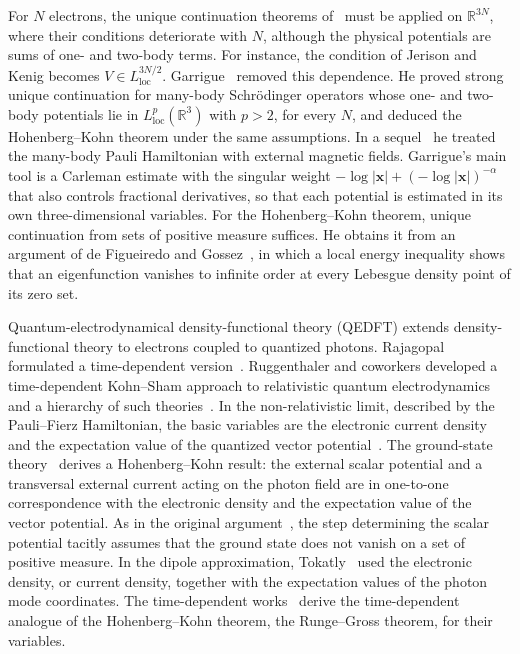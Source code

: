 \documentclass[final,reqno]{amsart}
\theoremstyle{remark}
\newcommand{\RR}{\mathbb{R}}
\newcommand{\vx}{\mathbf{x}}
\begin{document}
For $N$ electrons, the unique continuation theorems
of~\cite{jerison1985unique,kurata1997unique,koch2001carleman} must be
applied on $\RR^{3N}$, where their conditions deteriorate with $N$,
although the physical potentials are sums of one- and two-body terms.
For instance, the condition of Jerison and Kenig becomes
$V\in L^{3N/2}_\mathrm{loc}$.  Garrigue~\cite{garrigue2018unique}
removed this dependence.  He proved strong unique continuation for
many-body Schr\"odinger operators whose one- and two-body potentials
lie in $L^p_\mathrm{loc}(\RR^3)$ with $p>2$, for every $N$, and
deduced the Hohenberg--Kohn theorem under the same assumptions.  In a
sequel~\cite{garrigue2020unique} he treated the many-body Pauli
Hamiltonian with external magnetic fields.  Garrigue's main tool is a
Carleman estimate with the singular weight
$-\log|\vx|+(-\log|\vx|)^{-\alpha}$ that also controls fractional
derivatives, so that each potential is estimated in its own
three-dimensional variables.  For the Hohenberg--Kohn theorem, unique
continuation from sets of positive measure suffices.  He obtains it from
an argument of de Figueiredo and Gossez~\cite{defigueiredo1992strict},
in which a local energy inequality
shows that an eigenfunction vanishes to infinite order at
every Lebesgue density point of its zero set.

Quantum-electrodynamical density-functional theory (QEDFT) extends
density-functional theory to electrons coupled to quantized photons.
Rajagopal formulated a time-dependent version~\cite{rajagopal1994time}.
Ruggenthaler and coworkers developed a time-dependent Kohn--Sham
approach to relativistic quantum
electrodynamics~\cite{ruggenthaler2011time} and a hierarchy of such
theories~\cite{ruggenthaler2014quantum}.  In the
non-relativistic limit, described by the Pauli--Fierz Hamiltonian, the
basic variables are the electronic current density and the expectation
value of the quantized vector potential~\cite{ruggenthaler2014quantum}.
The ground-state theory~\cite{ruggenthaler2015ground} derives a
Hohenberg--Kohn result: the external scalar potential and a transversal
external current acting on the photon field are in one-to-one
correspondence with the electronic density and the expectation value of
the vector potential.  As in the original
argument~\cite{hohenberg1964inhomogeneous}, the step determining the
scalar potential tacitly assumes that the ground state does not vanish on a
set of positive measure.  In the dipole approximation,
Tokatly~\cite{tokatly2013time} used the electronic density, or current
density, together with the expectation values of the photon mode
coordinates.  The time-dependent
works~\cite{ruggenthaler2011time,ruggenthaler2014quantum,tokatly2013time}
derive the time-dependent analogue of the Hohenberg--Kohn theorem, the
Runge--Gross theorem, for their variables.
\end{document}
